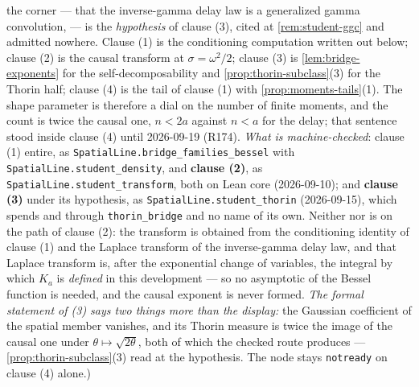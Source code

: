 \begin{proposition}
{the corner --- that the inverse-gamma delay law is a generalized gamma convolution, 
--- is the \emph{hypothesis} of clause (3), cited at \ref{rem:student-ggc} and admitted nowhere.
Clause (1) is the conditioning computation written out below; clause (2) is the causal transform
at $\sigma = \omega^2/2$; clause (3) is \ref{lem:bridge-exponents} for the
self-decomposability and \ref{prop:thorin-subclass}(3) for the Thorin half; clause (4) is the
tail of clause (1) with \ref{prop:moments-tails}(1). The shape parameter is therefore a dial on
the number of finite moments, and the count is twice the causal one, $n < 2a$ against $n < a$ for
the delay; that sentence stood inside clause (4) until 2026-09-19 (R174).
\emph{What is machine-checked}: clause (1) entire, as
\texttt{SpatialLine.bridge\_families\_bessel} with \texttt{SpatialLine.student\_density}, and
\textbf{clause (2)}, as \texttt{SpatialLine.student\_transform}, both on Lean core (2026-09-10);
and \textbf{clause (3)} under its hypothesis, as \texttt{SpatialLine.student\_thorin}
(2026-09-15), which spends  and  through
\texttt{thorin\_bridge} and no name of its own. Neither
 nor  is on the path of clause (2): the transform is obtained from the
conditioning identity of clause (1) and the Laplace transform of the inverse-gamma delay law,
and that Laplace transform is, after the exponential change of variables, the integral by which
$K_a$ is \emph{defined} in this development --- so no asymptotic of the Bessel function is
needed, and the causal exponent is never formed. \emph{The formal statement of (3) says two
things more than the display:} the Gaussian coefficient of the spatial member vanishes, and its
Thorin measure is twice the image of the causal one under $\theta \mapsto \sqrt{2\theta}$, both
of which the checked route produces --- \ref{prop:thorin-subclass}(3) read at the hypothesis.
The node stays \texttt{notready} on clause (4) alone.)}
\end{proposition}

